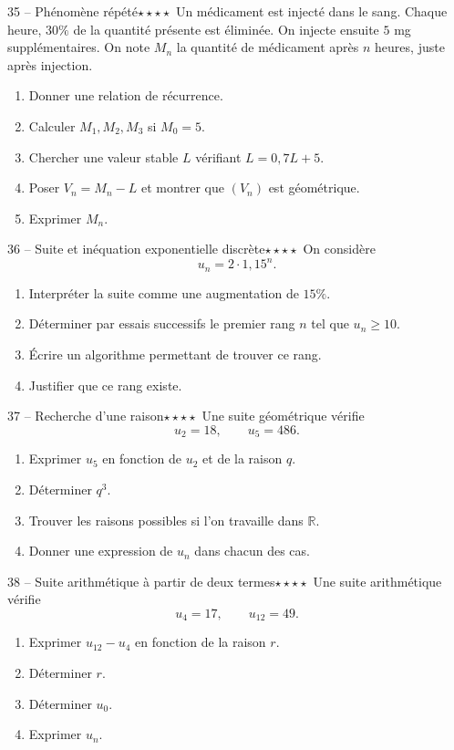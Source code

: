 \documentclass[11pt,a4paper]{article}
\newcommand{\R}{\mathbb{R}}
\newcommand{\quatreetoiles}{\(\star\star\star\star\)}
\begin{document}
\begin{exobox}{35 -- Phénomène répété}{\quatreetoiles}
Un médicament est injecté dans le sang. Chaque heure, \(30\%\) de la quantité présente est éliminée. On injecte ensuite \(5\) mg supplémentaires. On note \(M_n\) la quantité de médicament après \(n\) heures, juste après injection.
\begin{enumerate}[label=\alph*)]
  \item Donner une relation de récurrence.
  \item Calculer \(M_1,M_2,M_3\) si \(M_0=5\).
  \item Chercher une valeur stable \(L\) vérifiant \(L=0{,}7L+5\).
  \item Poser \(V_n=M_n-L\) et montrer que \((V_n)\) est géométrique.
  \item Exprimer \(M_n\).
\end{enumerate}
\end{exobox}

\begin{exobox}{36 -- Suite et inéquation exponentielle discrète}{\quatreetoiles}
On considère
\[
u_n=2\cdot 1{,}15^n.
\]
\begin{enumerate}[label=\alph*)]
  \item Interpréter la suite comme une augmentation de \(15\%\).
  \item Déterminer par essais successifs le premier rang \(n\) tel que \(u_n\geq 10\).
  \item Écrire un algorithme permettant de trouver ce rang.
  \item Justifier que ce rang existe.
\end{enumerate}
\end{exobox}

\begin{exobox}{37 -- Recherche d'une raison}{\quatreetoiles}
Une suite géométrique vérifie
\[
u_2=18,\qquad u_5=486.
\]
\begin{enumerate}[label=\alph*)]
  \item Exprimer \(u_5\) en fonction de \(u_2\) et de la raison \(q\).
  \item Déterminer \(q^3\).
  \item Trouver les raisons possibles si l'on travaille dans \(\R\).
  \item Donner une expression de \(u_n\) dans chacun des cas.
\end{enumerate}
\end{exobox}

\begin{exobox}{38 -- Suite arithmétique à partir de deux termes}{\quatreetoiles}
Une suite arithmétique vérifie
\[
u_4=17,\qquad u_{12}=49.
\]
\begin{enumerate}[label=\alph*)]
  \item Exprimer \(u_{12}-u_4\) en fonction de la raison \(r\).
  \item Déterminer \(r\).
  \item Déterminer \(u_0\).
  \item Exprimer \(u_n\).
\end{enumerate}
\end{exobox}
\end{document}
